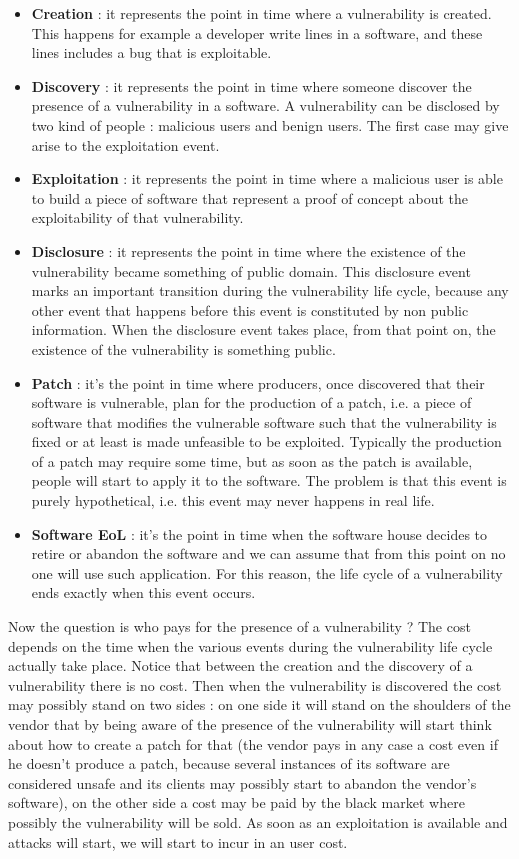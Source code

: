 \begin{itemize}
\item \textbf{Creation} : it represents the point in time where a vulnerability is created. This happens for example a developer write lines in a software, and these lines includes a bug that is exploitable.
\item \textbf{Discovery} : it represents the point in time where someone discover the presence of a vulnerability in a software. A vulnerability can be disclosed by two kind of people : malicious users and benign users. The first case may give arise to the exploitation event.
\item \textbf{Exploitation} : it represents the point in time where a malicious user is able to build a piece of software that represent a proof of concept about the exploitability of that vulnerability.
\item \textbf{Disclosure} : it represents the point in time where the existence of the vulnerability became something of public domain. This disclosure event marks an important transition during the vulnerability life cycle, because any other event that happens before this event is constituted by non public information. When the disclosure event takes place, from that point on, the existence of the vulnerability is something public.
\item \textbf{Patch} : it's the point in time where producers, once discovered that their software is vulnerable, plan for the production of a patch, i.e. a piece of software that modifies the vulnerable software such that the vulnerability is fixed or at least is made unfeasible to be exploited. Typically the production of a patch may require some time, but as soon as the patch is available, people will start to apply it to the software. The problem is that this event is purely hypothetical, i.e. this event may never happens in real life.
\item \textbf{Software EoL} : it's the point in time when the software house decides to retire or abandon the software and we can assume that from this point on no one will use such application. For this reason, the life cycle of a vulnerability ends exactly when this event occurs.
\end{itemize}
Now the question is who pays for the presence of a vulnerability ? The cost depends on the time when the various events during the vulnerability life cycle actually take place. Notice that between the creation and the discovery of a vulnerability there is no cost. Then when the vulnerability is discovered the cost may possibly stand on two sides : on one side it will stand on the shoulders of the vendor that by being aware of the presence of the vulnerability will start think about how to create a patch for that (the vendor pays in any case a cost even if he doesn't produce a patch, because several instances of its software are considered unsafe and its clients may possibly start to abandon the vendor's software), on the other side a cost may be paid by the black market where possibly the vulnerability will be sold. As soon as an exploitation is available and attacks will start, we will start to incur in an user cost.